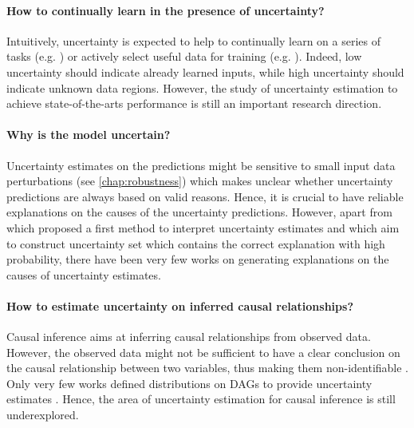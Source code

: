 \paragraph{How to continually learn in the presence of uncertainty?} Intuitively, uncertainty is expected to help to continually learn on a series of tasks (e.g. \cite{ebrahimi2020uncertainty-guided,khan2021knowledge,farquhar2018towards}) or actively select useful data for training (e.g. \cite{jain2022biological,gal2017bald,kirsch2019batch,kirsch2021simple,tata2022can}). Indeed, low uncertainty should indicate already learned inputs, while high uncertainty should indicate unknown data regions. However, the study of uncertainty estimation to achieve state-of-the-arts performance is still an important research direction.

\paragraph{Why is the model uncertain?} Uncertainty estimates on the predictions might be sensitive to small input data perturbations (see \cref{chap:robustness}) which makes unclear whether uncertainty predictions are always based on valid reasons. Hence, it is crucial to have reliable explanations on the causes of the uncertainty predictions. However, apart from \cite{antoran2021getting} which proposed a first method to interpret uncertainty estimates and \cite{marx2022but} which aim to construct uncertainty set which contains the correct explanation with high probability, there have been very few works on generating explanations on the causes of uncertainty estimates. 

\paragraph{How to estimate uncertainty on inferred causal relationships?} Causal inference aims at inferring causal relationships from observed data. However, the observed data might not be sufficient to have a clear conclusion on the causal relationship between two variables, thus making them non-identifiable \cite{pearl2009causality}. Only very few works defined distributions on DAGs to provide uncertainty estimates \cite{charpentier2022dpdag}. Hence, the area of uncertainty estimation for causal inference is still underexplored.


